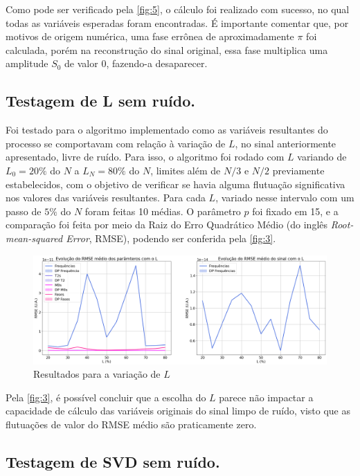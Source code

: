\documentclass[12pt]{article}
\begin{document}
Como pode ser verificado pela \autoref{fig:5}, o cálculo foi realizado com sucesso, no qual todas as variáveis esperadas foram encontradas. É importante comentar 
que, por motivos de origem numérica, uma fase errônea de aproximadamente $\pi$ foi calculada, porém na reconstrução do sinal original, essa fase multiplica uma 
amplitude $S_0$ de valor 0, fazendo-a desaparecer. 

\subsection{Testagem de L sem ruído.}

Foi testado para o algoritmo implementado como as variáveis resultantes do processo se comportavam com relação à variação de $L$, no sinal 
anteriormente apresentado, livre de ruído. Para isso, o algoritmo foi rodado com $L$ variando de $L_0 = 20\%$ do $N$ a $L_N = 80\%$ do $N$, 
limites além de $N/3$ e $N/2$ previamente estabelecidos, com o objetivo de verificar se havia alguma flutuação significativa nos valores das 
variáveis resultantes. Para cada $L$, variado nesse intervalo com um passo de $5\%$ do $N$ foram feitas 10 médias. O parâmetro $p$ foi fixado 
em 15, e a comparação foi feita por meio da Raiz do Erro Quadrático Médio (do inglês \textit{Root-mean-squared Error}, RMSE), podendo ser 
conferida pela \autoref{fig:3}.

\begin{figure} [H]
    \centering
    \includegraphics[scale=0.3125]{RMSE-L.png}
    \caption{Resultados para a variação de $L$}
    \label{fig:3}
\end{figure}

Pela \autoref{fig:3}, é possível concluir que a escolha do $L$ parece não impactar a capacidade de cálculo das variáveis originais do sinal 
limpo de ruído, visto que as flutuações de valor do RMSE médio são praticamente zero.

\subsection{Testagem de SVD sem ruído.}
\end{document}
